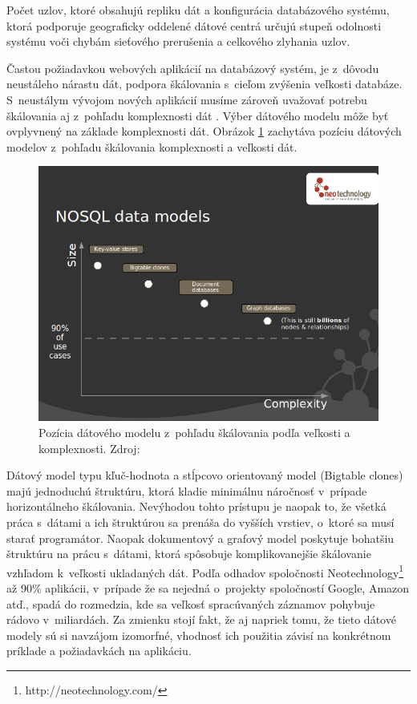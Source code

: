 \documentclass[11pt,twoside,a4paper]{book}
\begin{document}
Počet uzlov, ktoré obsahujú repliku dát a konfigurácia databázového systému, ktorá podporuje geograficky oddelené dátové centrá určujú stupeň odolnosti systému voči chybám sieťového prerušenia a celkového zlyhania uzlov.

Častou požiadavkou webových aplikácií na databázový systém, je z~dôvodu neustáleho nárastu dát, podpora škálovania s~cieľom zvýšenia veľkosti databáze. S~neustálym vývojom nových aplikácií musíme zároveň uvažovať potrebu škálovania aj z~pohľadu komplexnosti dát \cite{segaran2009beautiful}. Výber dátového modelu môže byť ovplyvnený na základe komplexnosti dát. Obrázok \ref{fig:scalling} zachytáva pozíciu dátových modelov z~pohľadu škálovania komplexnosti a veľkosti dát.


\begin{figure}[h]
 \centering
 \includegraphics[width=13cm]{./figures/nosqldatamodels.png}
 \caption{Pozícia dátového modelu z~pohľadu škálovania podľa veľkosti a komplexnosti. Zdroj: \cite{neo4j}}
 \label{fig:scalling}
\end{figure}

Dátový model typu kľuč-hodnota a stĺpcovo orientovaný model (Bigtable clones) majú jednoduchú štruktúru, ktorá kladie minimálnu náročnosť v~prípade horizontálneho škálovania. Nevýhodou tohto prístupu je naopak to, že všetká práca s~dátami a ich štruktúrou sa prenáša do vyšších vrstiev, o~ktoré sa musí starať programátor. Naopak dokumentový a grafový model poskytuje bohatšiu štruktúru na prácu s~dátami, ktorá spôsobuje komplikovanejšie škálovanie vzhľadom k~veľkosti ukladaných dát. Podľa odhadov spoločnosti Neotechnology\footnote{http://neotechnology.com/} až 90\% aplikácii, v~prípade že sa nejedná o~projekty spoločností Google, Amazon atď., spadá do rozmedzia, kde sa veľkosť spracúvaných záznamov pohybuje rádovo v~miliardách. Za zmienku stojí fakt, že aj napriek tomu, že tieto dátové modely sú si navzájom izomorfné, vhodnosť ich použitia závisí na konkrétnom príklade a požiadavkách na aplikáciu. 
\end{document}
